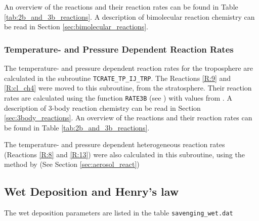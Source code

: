 \medskip

An overview of the reactions and their reaction rates can be found in Table \ref{tab:2b_and_3b_reactions}. A description of bimolecular reaction chemistry can be read in Section \ref{sec:bimolecular_reactions}. 

\subsubsection{Temperature- and Pressure Dependent Reaction Rates}\label{sec:temp_press_dependent_react_rates}

The temperature- and pressure dependent reaction rates for the troposphere are calculated in the subroutine \texttt{TCRATE\_TP\_IJ\_TRP}. The Reactions \ref{R:9} and \ref{R:cl_ch4} were moved to this subroutine, from the stratosphere. Their reaction rates are calculated using the function \texttt{RATE3B} (see \cite{SovdeManual}) with values from \cite{JPL}. A description of 3-body reaction chemistry can be read in Section \ref{sec:3body_reactions}. An overview of the reactions and their reaction rates can be found in Table \ref{tab:2b_and_3b_reactions}. 

\medskip

The temperature- and pressure dependent heterogeneous reaction rates (Reactions \ref{R:8} and \ref{R:13}) were also calculated in this subroutine, using the method by \cite{CAO} (See Section \ref{sec:aerosol_react})




\subsection{Wet Deposition and Henry's law}\label{sec:henrys_law_ctm3}

The wet deposition parameters are listed in the table \texttt{savenging\_wet.dat} 

%

%